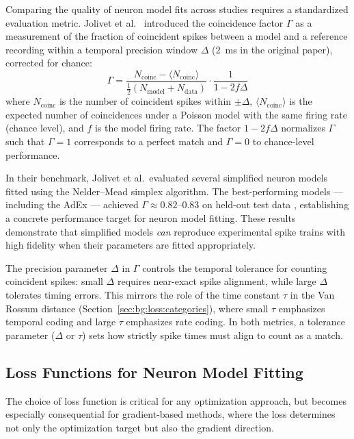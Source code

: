 Comparing the quality of neuron model fits across studies requires a standardized evaluation metric.
Jolivet et al.\ \cite{Jolivet2008} introduced the coincidence factor $\Gamma$ as
a measurement of the fraction of coincident spikes between a model and a reference recording within a temporal precision window $\Delta$ ($2$~ms in the original paper), corrected for chance:
\begin{equation}\label{eq:gamma}
  \Gamma = \frac{N_{\text{coinc}} - \langle N_{\text{coinc}} \rangle}{\tfrac{1}{2}(N_{\text{model}} + N_{\text{data}})} \cdot \frac{1}{1 - 2 f \Delta}
\end{equation}
where $N_{\text{coinc}}$ is the number of coincident spikes within $\pm\Delta$, $\langle N_{\text{coinc}} \rangle$ is the expected number of coincidences under a Poisson model with the same firing rate (chance level), and $f$ is the model firing rate.
The factor $1 - 2 f \Delta$ normalizes $\Gamma$ such that $\Gamma = 1$ corresponds to a perfect match and $\Gamma = 0$ to chance-level performance.

In their benchmark, Jolivet et al.\ evaluated several simplified neuron models fitted using the Nelder--Mead simplex algorithm.
The best-performing models --- including the \gls{AdEx} --- achieved $\Gamma \approx 0.82$--$0.83$ on held-out test data \cite{Jolivet2008}, establishing a concrete performance target for neuron model fitting.
These results demonstrate that simplified models \emph{can} reproduce experimental spike trains with high fidelity when their parameters are fitted appropriately.

The precision parameter $\Delta$ in $\Gamma$ controls the temporal tolerance for counting coincident spikes: small $\Delta$ requires near-exact spike alignment, while large $\Delta$ tolerates timing errors.
This mirrors the role of the time constant $\tau$ in the Van Rossum distance (Section~\ref{sec:bg:loss:categories}), where small $\tau$ emphasizes temporal coding and large $\tau$ emphasizes rate coding.
In both metrics, a tolerance parameter ($\Delta$ or $\tau$) sets how strictly spike times must align to count as a match.

\subsection{Loss Functions for Neuron Model Fitting}\label{sec:rw:loss}

The choice of loss function is critical for any optimization approach, but becomes especially consequential for gradient-based methods, where the loss determines not only the optimization target but also the gradient direction.

